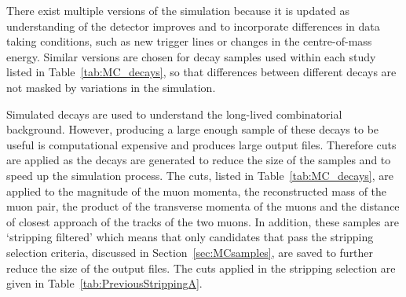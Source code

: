 There exist multiple versions of the simulation because it is updated as understanding of the detector improves and to incorporate differences in data taking conditions, such as new trigger lines or changes in the centre-of-mass energy. 
Similar versions are chosen for decay samples used within each study listed in Table~\ref{tab:MC_decays}, so that differences between different decays are not masked by variations in the simulation.%




Simulated \bbbarmumux decays are used to understand the long-lived combinatorial background. However, producing a large enough sample of these decays to be useful is computational expensive and produces large output files. Therefore cuts are applied as the decays are generated to reduce the size of the samples and to speed up the simulation process. The cuts, listed in Table~\ref{tab:MC_decays}, are applied to the magnitude of the muon momenta, the reconstructed mass of the muon pair, the product of the transverse momenta of the muons and the distance of closest approach of the tracks of the two muons. In addition, these samples are `stripping filtered' which means that only candidates that pass the \bmumu stripping selection criteria, discussed in Section~\ref{sec:MCsamples}, are saved to further reduce the size of the output files. The cuts applied in the stripping selection are given in Table~\ref{tab:PreviousStrippingA}.%
  

